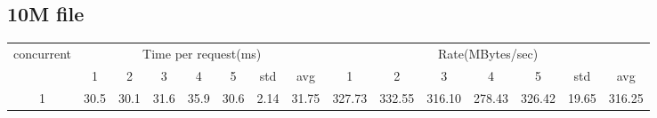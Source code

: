 \documentclass{article}
\begin{document}
\subsection*{10M file}
\begin{table}[H]
    \begin{tabular}{|c|c|c|c|c|c|c|c|c|c|c|c|c|c|c|}
        \hline
        \multirow{2}{*}{concurrent} & \multicolumn{7}{c|}{Time per request(ms)} & \multicolumn{7}{c|}{Rate(MBytes/sec)}                                                                                                   \\ \cline{2-15}
                                    & 1                                         & 2                                     & 3    & 4    & 5    & std  & avg   & 1      & 2      & 3      & 4      & 5      & std   & avg    \\ \hline
        1                           & 30.5                                      & 30.1                                  & 31.6 & 35.9 & 30.6 & 2.14 & 31.75 & 327.73 & 332.55 & 316.10 & 278.43 & 326.42 & 19.65 & 316.25 \\ \hline
    \end{tabular}
\end{table}
\end{document}
